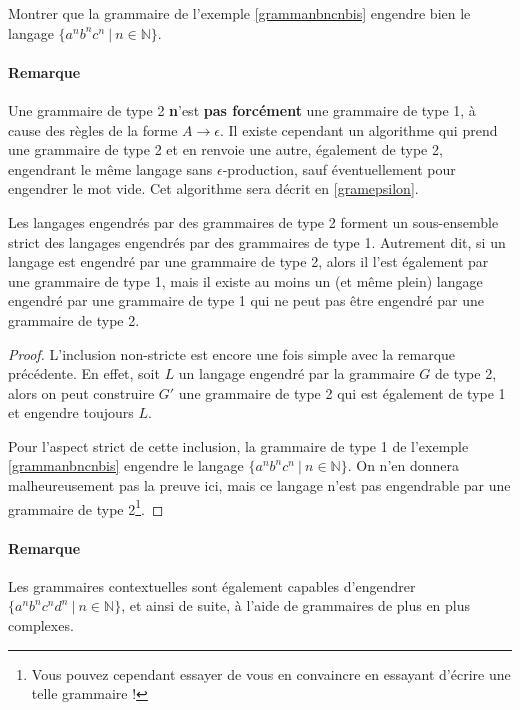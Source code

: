 \begin{exercice}
Montrer que la grammaire de l'exemple \ref{grammanbncnbis} engendre bien le langage \newline $\{a^nb^nc^n ~|~ n \in \mathbb{N}\}$.
\end{exercice}

\paragraph{Remarque} Une grammaire de type 2 \textbf{n}'est \textbf{pas forcément} une grammaire de type 1, à cause des règles de la forme $A \rightarrow \epsilon$. Il existe cependant un algorithme qui prend une grammaire de type 2 et en renvoie une autre, également de type 2, engendrant le même langage sans $\epsilon$-production, sauf éventuellement pour engendrer le mot vide. Cet algorithme sera décrit en \ref{gramepsilon}.

\begin{lemma}
Les langages engendrés par des grammaires de type 2 forment un sous-ensemble strict des langages engendrés par des grammaires de type 1. Autrement dit, si un langage est engendré par une grammaire de type 2, alors il l'est également par une grammaire de type 1, mais il existe au moins un (et même plein) langage engendré par une grammaire de type 1 qui ne peut pas être engendré par une grammaire de type 2.  
\end{lemma}

\begin{proof}
L'inclusion non-stricte est encore une fois simple avec la remarque précédente. En effet, soit $L$ un langage engendré par la grammaire $G$ de type 2, alors on peut construire $G'$ une grammaire de type 2 qui est également de type 1 et engendre toujours $L$.

Pour l'aspect strict de cette inclusion, la grammaire de type 1 de l'exemple \ref{grammanbncnbis} engendre le langage $\{a^nb^nc^n ~|~ n \in \mathbb{N}\}$. On n'en donnera malheureusement pas la preuve ici, mais ce langage n'est pas engendrable par une grammaire de type 2\footnote{Vous pouvez cependant essayer de vous en convaincre en essayant d'écrire une telle grammaire !}.
\end{proof}


\paragraph{Remarque} Les grammaires contextuelles sont également capables d'engendrer \newline $\{a^nb^nc^nd^n ~|~ n \in \mathbb{N}\}$, et ainsi de suite, à l'aide de grammaires de plus en plus complexes.



